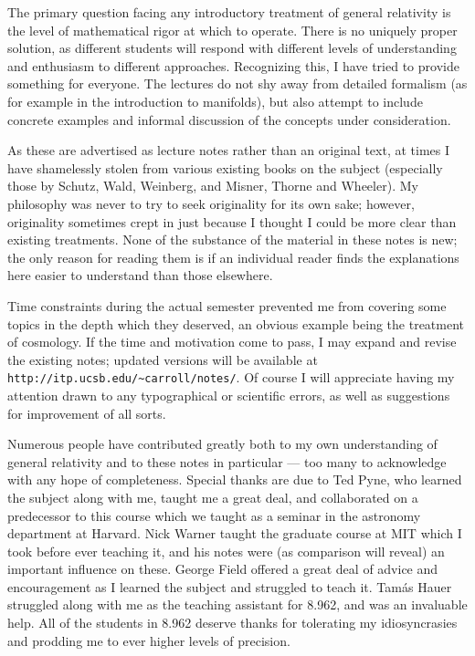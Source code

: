 \documentclass[12pt]{article}
\begin{document}
The primary question facing any introductory treatment of general
relativity is the level of mathematical rigor at which to operate.
There is no uniquely proper solution, as different students will
respond with different levels of understanding and enthusiasm to
different approaches.  Recognizing this, I have tried to provide
something for everyone.  The lectures do not shy away from
detailed formalism (as for example in the introduction to manifolds),
but also attempt to include concrete examples and informal
discussion of the concepts under consideration.  

As these are advertised as lecture notes rather than an original
text, at times I have shamelessly stolen from various existing books
on the subject (especially those by Schutz, Wald, Weinberg, and
Misner, Thorne and Wheeler).  My philosophy was never to try to seek
originality for its own sake; however, originality sometimes 
crept in just because I thought I could be more clear than existing
treatments.  None of the substance of the material in these notes is 
new; the only reason for reading them is if an individual reader
finds the explanations here easier to understand than those elsewhere.

Time constraints during the actual semester prevented me from
covering some topics in the depth which they deserved, an obvious
example being the treatment of cosmology.  If the time and motivation
come to pass, I may expand and revise the existing notes; updated
versions will be available at 
{\tt http://itp.ucsb.edu/{\~{}}carroll/notes/}.  Of course I will
appreciate having my attention drawn to any typographical or
scientific errors, as well as suggestions for improvement of
all sorts.

Numerous people have contributed greatly both to my own understanding
of general relativity and to these notes in particular --- too many
to acknowledge with any hope of completeness.  
Special thanks are due to Ted Pyne, who learned
the subject along with me, taught me a great deal,
and collaborated on a predecessor to this
course which we taught as a seminar in the astronomy department at
Harvard.  Nick Warner taught the graduate course at MIT which I
took before ever teaching it, and his notes were (as comparison will
reveal) an important influence on these.  George Field offered a
great deal of advice and encouragement as I learned the subject and
struggled to teach it.  Tam\'as Hauer struggled along with me as the 
teaching assistant for 8.962, and was an invaluable help.  All of
the students in 8.962 deserve thanks for tolerating my idiosyncrasies
and prodding me to ever higher levels of precision.
\end{document}
